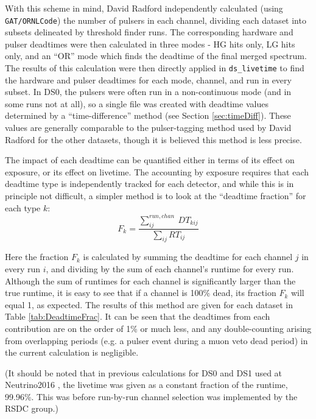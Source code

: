 \documentclass[notitlepage,rmp,aps,10pt]{revtex4-1}
\newcommand{\tty}{\texttt}
\begin{document}
With this scheme in mind, David Radford independently calculated (using \tty{GAT/ORNLCode}) the number of pulsers in each channel, dividing each dataset into subsets delineated by threshold finder runs.  The corresponding hardware and pulser deadtimes were then calculated in three modes - HG hits only, LG hits only, and an ``OR'' mode which finds the deadtime of the final merged spectrum.  The results of this calculation were then directly applied in \tty{ds\_livetime} to find the hardware and pulser deadtimes for each mode, channel, and run in every subset.
In DS0, the pulsers were often run in a non-continuous mode (and in some runs not at all), so a single file was created with deadtime values determined by a ``time-difference'' method (see Section \ref{sec:timeDiff}).  These values are generally comparable to the pulser-tagging method used by David Radford for the other datasets, though it is believed this method is less precise.

The impact of each deadtime can be quantified either in terms of its effect on exposure, or its effect on livetime.  The accounting by exposure requires that each deadtime type is independently tracked for each detector, and while this is in principle not difficult, a simpler method is to look at the ``deadtime fraction'' for each type $k$:
\begin{equation}
  F_k = \frac{\sum_{ij}^{run,chan}\ DT_{kij}}{\sum_{ij}RT_{ij}}
\end{equation}

Here the fraction $F_k$ is calculated by summing the deadtime for each channel $j$ in every run $i$, and dividing by the sum of each channel's runtime for every run.  Although the sum of runtimes for each channel is significantly larger than the true runtime, it is easy to see that if a channel is 100\% dead, its fraction $F_k$ will equal 1, as expected.  The results of this method are given for each dataset in Table \ref{tab:DeadtimeFrac}.  It can be seen that the deadtimes from each contribution are on the order of 1\% or much less, and any double-counting arising from overlapping periods (e.g. a pulser event during a muon veto dead period) in the current calculation is negligible.

(It should be noted that in previous calculations \cite{Meijer2016} \cite{Meijer2016b} for DS0 and DS1 used at Neutrino2016 \cite{neutrino2016}, the livetime was given as a constant fraction of the runtime, 99.96\%.  This was before run-by-run channel selection was implemented by the RSDC group.)
\end{document}

